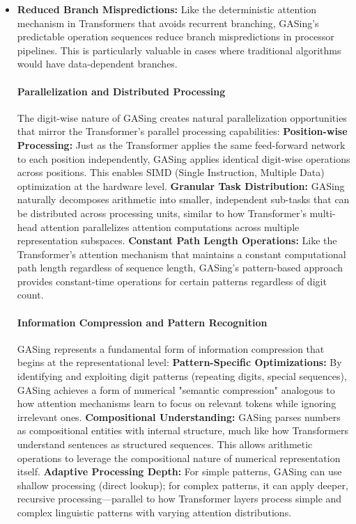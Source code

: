 \begin{itemize}
\item \textbf{\textbf{Reduced Branch Mispredictions}:} Like the deterministic attention mechanism in Transformers that avoids recurrent branching, GASing's predictable operation sequences reduce branch mispredictions in processor pipelines. This is particularly valuable in cases where traditional algorithms would have data-dependent branches.

\vspace{0.5em}
\noindent\hspace{2em}\paragraph{Parallelization and Distributed Processing}  The digit-wise nature of GASing creates natural parallelization opportunities that mirror the Transformer's parallel processing capabilities:   \noindent\textbf{\textbf{Position-wise Processing}:} Just as the Transformer applies the same feed-forward network to each position independently, GASing applies identical digit-wise operations across positions. This enables SIMD (Single Instruction, Multiple Data) optimization at the hardware level.    \noindent\textbf{\textbf{Granular Task Distribution}:} GASing naturally decomposes arithmetic into smaller, independent sub-tasks that can be distributed across processing units, similar to how Transformer's multi-head attention parallelizes attention computations across multiple representation subspaces.    \noindent\textbf{\textbf{Constant Path Length Operations}:} Like the Transformer's attention mechanism that maintains a constant computational path length regardless of sequence length, GASing's pattern-based approach provides constant-time operations for certain patterns regardless of digit count.  \paragraph{Information Compression and Pattern Recognition}  GASing represents a fundamental form of information compression that begins at the representational level:   \noindent\textbf{\textbf{Pattern-Specific Optimizations}:} By identifying and exploiting digit patterns (repeating digits, special sequences), GASing achieves a form of numerical "semantic compression" analogous to how attention mechanisms learn to focus on relevant tokens while ignoring irrelevant ones.    \noindent\textbf{\textbf{Compositional Understanding}:} GASing parses numbers as compositional entities with internal structure, much like how Transformers understand sentences as structured sequences. This allows arithmetic operations to leverage the compositional nature of numerical representation itself.    \noindent\textbf{\textbf{Adaptive Processing Depth}:} For simple patterns, GASing can use shallow processing (direct lookup); for complex patterns, it can apply deeper, recursive processing—parallel to how Transformer layers process simple and complex linguistic patterns with varying attention distributions.
\vspace{0.5em}

\end{itemize}


